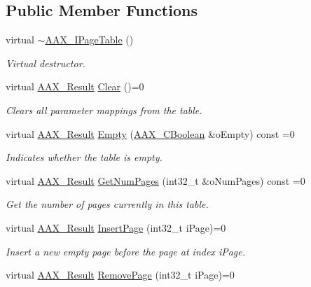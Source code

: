 \subsection*{Public Member Functions}
\begin{DoxyCompactItemize}
\item 
virtual \hyperlink{a00107_a5613c827997f9671abef60a591607ee8}{$\sim$\+A\+A\+X\+\_\+\+I\+Page\+Table} ()
\begin{DoxyCompactList}\small\item\em Virtual destructor. \end{DoxyCompactList}\item 
virtual \hyperlink{a00149_a4d8f69a697df7f70c3a8e9b8ee130d2f}{A\+A\+X\+\_\+\+Result} \hyperlink{a00107_a00a902ce17c43ae32947dba6088936d2}{Clear} ()=0
\begin{DoxyCompactList}\small\item\em Clears all parameter mappings from the table. \end{DoxyCompactList}\item 
virtual \hyperlink{a00149_a4d8f69a697df7f70c3a8e9b8ee130d2f}{A\+A\+X\+\_\+\+Result} \hyperlink{a00107_a6953bc99853c741500f5619b8e675c30}{Empty} (\hyperlink{a00149_aa216506530f1d19a2965931ced2b274b}{A\+A\+X\+\_\+\+C\+Boolean} \&o\+Empty) const =0
\begin{DoxyCompactList}\small\item\em Indicates whether the table is empty. \end{DoxyCompactList}\item 
virtual \hyperlink{a00149_a4d8f69a697df7f70c3a8e9b8ee130d2f}{A\+A\+X\+\_\+\+Result} \hyperlink{a00107_a663a8c380ff8f8234fcabb8e8619ac7d}{Get\+Num\+Pages} (int32\+\_\+t \&o\+Num\+Pages) const =0
\begin{DoxyCompactList}\small\item\em Get the number of pages currently in this table. \end{DoxyCompactList}\item 
virtual \hyperlink{a00149_a4d8f69a697df7f70c3a8e9b8ee130d2f}{A\+A\+X\+\_\+\+Result} \hyperlink{a00107_a95b7b4d99253e26dd46d2deb4cf96bf8}{Insert\+Page} (int32\+\_\+t i\+Page)=0
\begin{DoxyCompactList}\small\item\em Insert a new empty page before the page at index {\ttfamily i\+Page}. \end{DoxyCompactList}\item 
virtual \hyperlink{a00149_a4d8f69a697df7f70c3a8e9b8ee130d2f}{A\+A\+X\+\_\+\+Result} \hyperlink{a00107_a2e5def73da595907d6486ff199168dd3}{Remove\+Page} (int32\+\_\+t i\+Page)=0

\end{DoxyCompactItemize}
